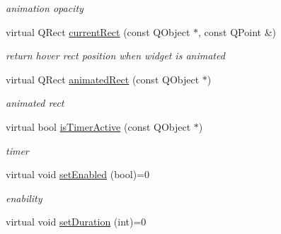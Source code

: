 \begin{DoxyCompactItemize}
\begin{DoxyCompactList}\small\item\em animation opacity \end{DoxyCompactList}\item 
\mbox{\label{class_menu_bar_base_engine_aab182ead383787144f5cf5f6e634340e}} 
virtual Q\+Rect \hyperlink{class_menu_bar_base_engine_aab182ead383787144f5cf5f6e634340e}{current\+Rect} (const Q\+Object $\ast$, const Q\+Point \&)
\begin{DoxyCompactList}\small\item\em return \textquotesingle{}hover\textquotesingle{} rect position when widget is animated \end{DoxyCompactList}\item 
\mbox{\label{class_menu_bar_base_engine_a15a483ee329fd91a78eeb82be0f30277}} 
virtual Q\+Rect \hyperlink{class_menu_bar_base_engine_a15a483ee329fd91a78eeb82be0f30277}{animated\+Rect} (const Q\+Object $\ast$)
\begin{DoxyCompactList}\small\item\em animated rect \end{DoxyCompactList}\item 
\mbox{\label{class_menu_bar_base_engine_ad009bfc2fad9dcaac4f258ec6b8df466}} 
virtual bool \hyperlink{class_menu_bar_base_engine_ad009bfc2fad9dcaac4f258ec6b8df466}{is\+Timer\+Active} (const Q\+Object $\ast$)
\begin{DoxyCompactList}\small\item\em timer \end{DoxyCompactList}\item 
\mbox{\label{class_menu_bar_base_engine_a1742098c3576747b413dab2af6cf0f52}} 
virtual void \hyperlink{class_menu_bar_base_engine_a1742098c3576747b413dab2af6cf0f52}{set\+Enabled} (bool)=0
\begin{DoxyCompactList}\small\item\em enability \end{DoxyCompactList}\item 
\mbox{\label{class_menu_bar_base_engine_a4f1e559fef29f0f6d66ffe49a9da0486}} 
virtual void \hyperlink{class_menu_bar_base_engine_a4f1e559fef29f0f6d66ffe49a9da0486}{set\+Duration} (int)=0

\end{DoxyCompactItemize}
